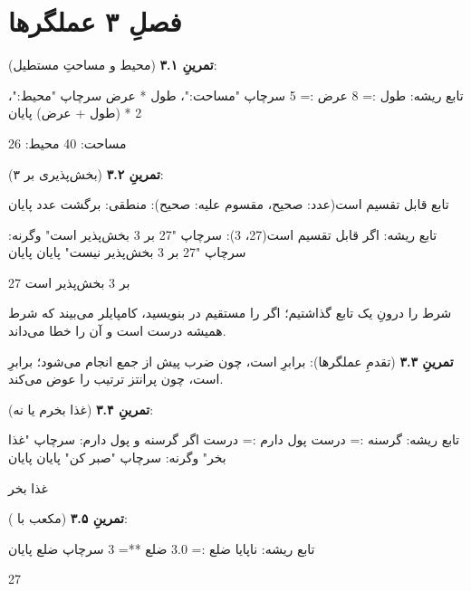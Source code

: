 \section*{فصلِ ۳ عملگرها}
{}

\textbf{تمرینِ ۳.۱} (محیط و مساحتِ مستطیل):
\begin{salamfa}
تابع ریشه:
    طول := 8
    عرض := 5
    سرچاپ "مساحت:"، طول * عرض
    سرچاپ "محیط:"، 2 * (طول + عرض)
پایان
\end{salamfa}

\begin{progoutfa}
مساحت: 40
محیط: 26
\end{progoutfa}

\textbf{تمرینِ ۳.۲} (بخش‌پذیری بر ۳):
\begin{salamfa}
تابع قابل تقسیم است(عدد: صحیح، مقسوم علیه: صحیح): منطقی:
    برگشت عدد %
پایان

تابع ریشه:
    اگر قابل تقسیم است(27، 3):
        سرچاپ "27 بر 3 بخش‌پذیر است"
    وگرنه:
        سرچاپ "27 بر 3 بخش‌پذیر نیست"
    پایان
پایان
\end{salamfa}

\begin{progoutfa}
27 بر 3 بخش‌پذیر است
\end{progoutfa}

شرط را درونِ یک تابع گذاشتیم؛ اگر  را مستقیم در  بنویسید، کامپایلر می‌بیند که شرط همیشه درست است و آن را خطا می‌داند.

\textbf{تمرینِ ۳.۳} (تقدمِ عملگرها):  برابرِ  است، چون ضرب پیش از جمع انجام می‌شود؛  برابرِ  است، چون پرانتز ترتیب را عوض می‌کند.

\textbf{تمرینِ ۳.۴} (غذا بخرم یا نه):
\begin{salamfa}
تابع ریشه:
    گرسنه := درست
    پول دارم := درست
    اگر گرسنه و پول دارم:
        سرچاپ "غذا بخر"
    وگرنه:
        سرچاپ "صبر کن"
    پایان
پایان
\end{salamfa}

\begin{progoutfa}
غذا بخر
\end{progoutfa}

\textbf{تمرینِ ۳.۵} (مکعب با \code{**=}):
\begin{salamfa}
تابع ریشه:
    ناپایا ضلع := 3.0
    ضلع **= 3
    سرچاپ ضلع
پایان
\end{salamfa}

\begin{progoutfa}
27
\end{progoutfa}

